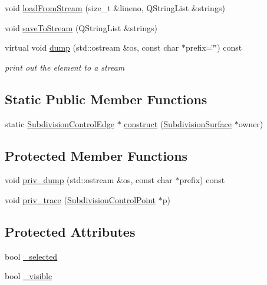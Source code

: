 \begin{DoxyCompactItemize}
\item 
void \hyperlink{classShipCAD_1_1SubdivisionControlEdge_a318bf4102460ba91fd9e79fbde265ee3}{load\-From\-Stream} (size\-\_\-t \&lineno, Q\-String\-List \&strings)
\item 
void \hyperlink{classShipCAD_1_1SubdivisionControlEdge_a9228cf5bb5b09daf26eb4022f09337f0}{save\-To\-Stream} (Q\-String\-List \&strings)
\item 
virtual void \hyperlink{classShipCAD_1_1SubdivisionControlEdge_abdfa96ff05eff404214a92d38d7eb715}{dump} (std\-::ostream \&os, const char $\ast$prefix=\char`\"{}\char`\"{}) const 
\begin{DoxyCompactList}\small\item\em print out the element to a stream \end{DoxyCompactList}\end{DoxyCompactItemize}
\subsection*{Static Public Member Functions}
\begin{DoxyCompactItemize}
\item 
static \hyperlink{classShipCAD_1_1SubdivisionControlEdge}{Subdivision\-Control\-Edge} $\ast$ \hyperlink{classShipCAD_1_1SubdivisionControlEdge_a20fc507b201766b6e3d0560595946fac}{construct} (\hyperlink{classShipCAD_1_1SubdivisionSurface}{Subdivision\-Surface} $\ast$owner)
\end{DoxyCompactItemize}
\subsection*{Protected Member Functions}
\begin{DoxyCompactItemize}
\item 
void \hyperlink{classShipCAD_1_1SubdivisionControlEdge_acc4cee57db50beb1dcc6361f7f2c62af}{priv\-\_\-dump} (std\-::ostream \&os, const char $\ast$prefix) const 
\item 
void \hyperlink{classShipCAD_1_1SubdivisionControlEdge_aec6ff8caa6996ae5a9d2e58d5d2b0344}{priv\-\_\-trace} (\hyperlink{classShipCAD_1_1SubdivisionControlPoint}{Subdivision\-Control\-Point} $\ast$p)
\end{DoxyCompactItemize}
\subsection*{Protected Attributes}
\begin{DoxyCompactItemize}
\item 
bool \hyperlink{classShipCAD_1_1SubdivisionControlEdge_a8e67d30ef7ef87ff599f73b59c806f58}{\-\_\-selected}
\item 
bool \hyperlink{classShipCAD_1_1SubdivisionControlEdge_a8d49343e2b6ff0ab13653849af242740}{\-\_\-visible}
\end{DoxyCompactItemize}
